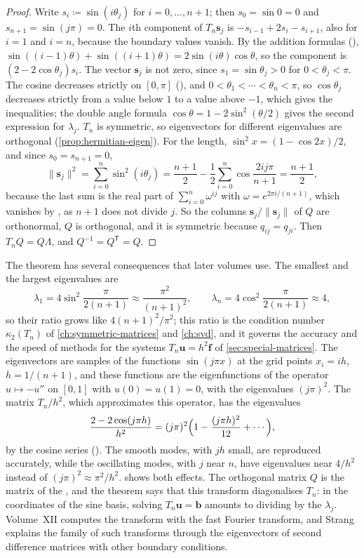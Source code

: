 \begin{proof}
Write $s_i\coloneqq\sin(i\theta_j)$ for $i=0,\ldots,n+1$; then $s_0=\sin0=0$ and $s_{n+1}=\sin(j\pi)=0$. The $i$th component of $T_n\mathbf s_j$ is $-s_{i-1}+2s_i-s_{i+1}$, also for $i=1$ and $i=n$, because the boundary values vanish. By the addition formulas (), $\sin((i-1)\theta)+\sin((i+1)\theta)=2\sin(i\theta)\cos\theta$, so the component is $(2-2\cos\theta_j)s_i$. The vector $\mathbf s_j$ is not zero, since $s_1=\sin\theta_j>0$ for $0<\theta_j<\pi$. The cosine decreases strictly on $[0,\pi]$ (), and $0<\theta_1<\cdots<\theta_n<\pi$, so $\cos\theta_j$ decreases strictly from a value below $1$ to a value above $-1$, which gives the inequalities; the double angle formula $\cos\theta=1-2\sin^2(\theta/2)$ gives the second expression for $\lambda_j$. $T_n$ is symmetric, so eigenvectors for different eigenvalues are orthogonal (\cref{prop:hermitian-eigen}). For the length, $\sin^2x=(1-\cos2x)/2$, and since $s_0=s_{n+1}=0$,
\[
\|\mathbf s_j\|^2=\sum_{i=0}^{n}\sin^2(i\theta_j)=\frac{n+1}2-\frac12\sum_{i=0}^{n}\cos\frac{2ij\pi}{n+1}=\frac{n+1}2,
\]
because the last sum is the real part of $\sum_{i=0}^n\omega^{ij}$ with $\omega=e^{2\pi i/(n+1)}$, which vanishes by , as $n+1$ does not divide $j$. So the columns $\mathbf s_j/\|\mathbf s_j\|$ of $Q$ are orthonormal, $Q$ is orthogonal, and it is symmetric because $q_{ij}=q_{ji}$. Then $T_nQ=Q\Lambda$, and $Q^{-1}=Q^{\mathsf T}=Q$.
\end{proof}

The theorem has several consequences that later volumes use. The smallest and the largest eigenvalues are
\[
\lambda_1=4\sin^2\frac{\pi}{2(n+1)}\approx\frac{\pi^2}{(n+1)^2},\qquad\lambda_n=4\cos^2\frac{\pi}{2(n+1)}\approx4,
\]
so their ratio grows like $4(n+1)^2/\pi^2$; this ratio is the condition number $\kappa_2(T_n)$ of \cref{ch:symmetric-matrices} and \cref{ch:svd}, and it governs the accuracy and the speed of methods for the systems $T_n\mathbf u=h^2\mathbf f$ of \cref{sec:special-matrices}. The eigenvectors are samples of the functions $\sin(j\pi x)$ at the grid points $x_i=ih$, $h=1/(n+1)$, and these functions are the eigenfunctions of the operator $u\mapsto-u''$ on $[0,1]$ with $u(0)=u(1)=0$, with the eigenvalues $(j\pi)^2$. The matrix $T_n/h^2$, which approximates this operator, has the eigenvalues
\[
\frac{2-2\cos(j\pi h)}{h^2}=(j\pi)^2\Bigl(1-\frac{(j\pi h)^2}{12}+\cdots\Bigr),
\]
by the cosine series (). The smooth modes, with $jh$ small, are reproduced accurately, while the oscillating modes, with $j$ near $n$, have eigenvalues near $4/h^2$ instead of $(j\pi)^2\approx\pi^2/h^2$.  shows both effects. The orthogonal matrix $Q$ is the matrix of the , and the theorem says that this transform diagonalises $T_n$: in the coordinates of the sine basis, solving $T_n\mathbf u=\mathbf b$ amounts to dividing by the $\lambda_j$. Volume~XII computes the transform with the fast Fourier transform, and Strang~\cite{strang1999dct} explains the family of such transforms through the eigenvectors of second difference matrices with other boundary conditions.


